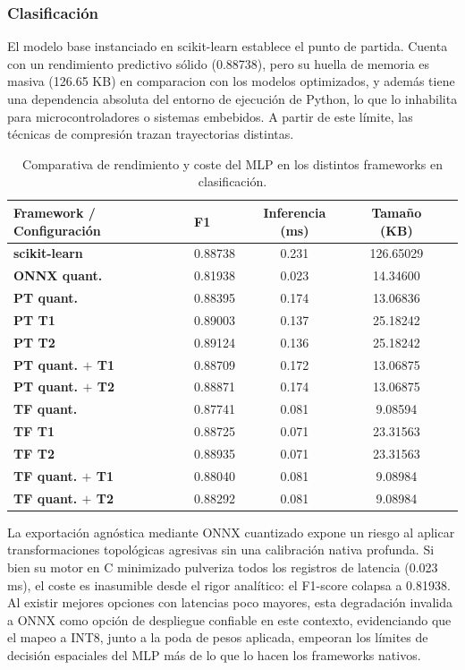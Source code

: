 \documentclass[a4paper,12pt,twoside,final]{book}
\begin{document}
\subsubsection{Clasificación}
El modelo base instanciado en scikit-learn establece el punto de partida. Cuenta con un rendimiento predictivo sólido
(0.88738), pero su huella de memoria es masiva (126.65 KB) en comparacion con los modelos optimizados, y además tiene una
dependencia absoluta del entorno de ejecución de Python, lo que lo inhabilita para microcontroladores o sistemas embebidos.
A partir de este límite, las técnicas de compresión trazan trayectorias distintas.
\newpage
\begin{table}[htbp]
  \centering
  \begin{tabularx}{\textwidth}{lXccc}
    \hline
    \textbf{Framework / Configuración} & \textbf{F1} & \textbf{Inferencia (ms)} & \textbf{Tamaño (KB)} \\
    \hline
    \textbf{scikit-learn}     & 0.88738 & 0.231 & 126.65029 \\
    \hline
    \textbf{ONNX quant.}      & 0.81938 & 0.023 & 14.34600  \\
    \hline
    \textbf{PT quant.}        & 0.88395 & 0.174 & 13.06836  \\
    \textbf{PT T1}            & 0.89003 & 0.137 & 25.18242  \\
    \textbf{PT T2}            & 0.89124 & 0.136 & 25.18242  \\
    \textbf{PT quant. $+$ T1} & 0.88709 & 0.172 & 13.06875  \\
    \textbf{PT quant. $+$ T2} & 0.88871 & 0.174 & 13.06875  \\
    \hline
    \textbf{TF quant.}        & 0.87741 & 0.081 & 9.08594   \\
    \textbf{TF T1}            & 0.88725 & 0.071 & 23.31563  \\
    \textbf{TF T2}            & 0.88935 & 0.071 & 23.31563  \\
    \textbf{TF quant. $+$ T1} & 0.88040 & 0.081 & 9.08984   \\
    \textbf{TF quant. $+$ T2} & 0.88292 & 0.081 & 9.08984   \\
    \hline
  \end{tabularx}
  \caption{Comparativa de rendimiento y coste del MLP en los distintos frameworks en clasificación.}
  \label{tab:mlp_clas_resumen}
\end{table}
La exportación agnóstica mediante ONNX cuantizado expone un riesgo al aplicar transformaciones topológicas agresivas sin
una calibración nativa profunda. Si bien su motor en C minimizado pulveriza todos los registros de latencia
(0.023 ms), el coste es inasumible desde el rigor analítico: el F1-score colapsa a 0.81938. Al existir mejores opciones
con latencias poco mayores, esta degradación invalida a ONNX como opción de despliegue confiable en este contexto,
evidenciando que el mapeo a INT8, junto a la poda de pesos aplicada, empeoran los límites de decisión espaciales del MLP
más de lo que lo hacen los frameworks nativos.\\
\end{document}
